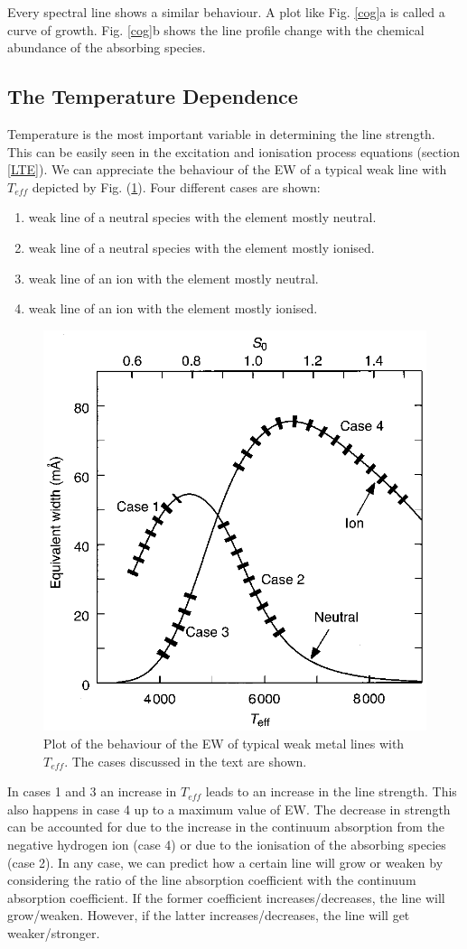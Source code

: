 \documentclass[dvips,12pt,a4paper]{report}
\begin{document}
{Every spectral line shows a similar behaviour. A plot like Fig. \ref{cog}a is called a curve of growth. Fig. \ref{cog}b shows the line profile change with the chemical abundance of the absorbing species.

\subsection{The Temperature Dependence}

Temperature is the most important variable in determining the line strength. This can be easily seen in the excitation and ionisation process equations (section \ref{LTE}).
We can appreciate the behaviour of the EW of a typical weak line with $T_{eff}$ depicted by Fig. (\ref{ewdp}). Four different cases are shown:
\begin{enumerate}
 \item weak line of a neutral species with the element mostly neutral.
 \item weak line of a neutral species with the element mostly ionised.
 \item weak line of an ion with the element mostly neutral.
 \item weak line of an ion with the element mostly ionised.
\end{enumerate}
\begin{figure}[h]
\centering
\includegraphics[height=6 cm]{pics/parte2/temperature.eps}
\caption[EW dependence on Temperature and Pressure] {Plot of the behaviour of the EW of typical weak metal lines with $T_{eff}$. The cases discussed in the text are shown.}%
\label{ewdp}
\end{figure}

In cases 1 and 3 an increase in $T_{eff}$ leads to an increase in the line strength. This also happens in case 4 up to a maximum value of EW. The decrease in strength can be accounted for due to the increase in the continuum absorption from the negative hydrogen ion (case 4) or due to the ionisation of the absorbing species (case 2). In any case, we can predict how a certain line will grow or weaken by considering the ratio of the line absorption coefficient with the continuum absorption coefficient. If the former coefficient increases/decreases, the line will grow/weaken. However, if the latter increases/decreases, the line will get weaker/stronger.

}
\end{document}
